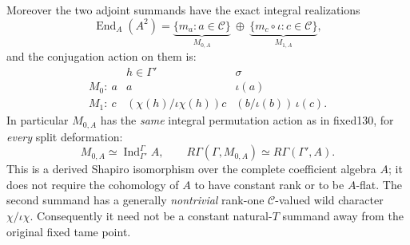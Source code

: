 \begin{theorem}
Moreover the two
adjoint summands
have the exact
integral realizations
\begin{equation}\label{eq:dyadic-f131-skew-endo-split}
\boxed{\quad
\operatorname{End}_A(A^2)
=
\underbrace{\{m_a:a\in\mathcal C\}}_{M_{0,A}}
\ \oplus\
\underbrace{\{m_c\circ\iota:c\in\mathcal C\}}_{M_{1,A}},
\quad}
\end{equation}
and the conjugation
action on them is:
\begin{equation}\label{eq:dyadic-f131-skew-endo-actions}
\boxed{
\begin{array}{c|cc}
& h\in\Gamma'&\sigma\\ \hline
M_0:\ a
 &a&\iota(a)\\
M_1:\ c
 &(\chi(h)/\iota\chi(h))c&
 (b/\iota(b))\,\iota(c).
\end{array}}
\end{equation}
In particular
$M_{0,A}$ has
the \emph{same}
integral permutation
action as in fixed130,
for \emph{every}
split deformation:
\begin{equation}\label{eq:dyadic-f131-family-shapiro-m0}
\boxed{\quad
M_{0,A}
\simeq\operatorname{Ind}_{\Gamma'}^\Gamma A,
\qquad
R\Gamma(\Gamma,M_{0,A})
\simeq R\Gamma(\Gamma',A).
\quad}
\end{equation}
This is a derived
Shapiro isomorphism
over the complete
coefficient algebra $A$;
it does not require
the cohomology of $A$
to have constant
rank or to be
$A$-flat.
The second summand
has a generally
\emph{nontrivial}
rank-one
$\mathcal C$-valued
wild character
$\chi/\iota\chi$.
Consequently it
need not be a
constant natural-$T$
summand away from
the original
fixed tame point.
\end{theorem}

